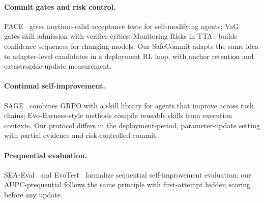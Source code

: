 \paragraph{Commit gates and risk control.}
PACE~\cite{pace2026} gives anytime-valid acceptance tests for
self-modifying agents; VaG~\cite{vag2026} gates skill admission with
verifier critics; Monitoring Risks in TTA~\cite{monitoring2025} builds
confidence sequences for changing models. Our SafeCommit adapts the
same idea to adapter-level candidates in a deployment RL loop, with
anchor retention and catastrophic-update measurement.

\paragraph{Continual self-improvement.}
SAGE~\cite{sage2026} combines GRPO with a skill library for agents that
improve across task chains; Evo-Harness-style methods compile reusable
skills from execution contexts. Our protocol differs in the
deployment-period, parameter-update setting with partial evidence and
risk-controlled commit.

\paragraph{Prequential evaluation.}
SEA-Eval~\cite{seaeval2026} and EvoTest~\cite{evotest2026} formalize
sequential self-improvement evaluation; our AUPC-prequential follows the
same principle with first-attempt hidden scoring before any update.

